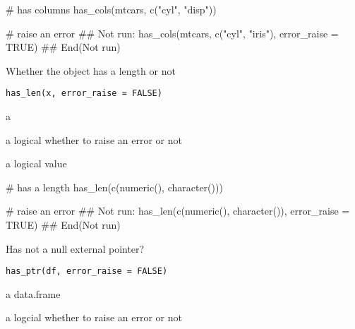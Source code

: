 \documentclass[letterpaper]{book}
\begin{document}
%
\begin{Examples}
\begin{ExampleCode}
# has columns
has_cols(mtcars, c("cyl", "disp"))

# raise an error
## Not run: 
has_cols(mtcars, c("cyl", "iris"), error_raise = TRUE)
## End(Not run)

\end{ExampleCode}
\end{Examples}
%
\begin{Description}
Whether the object has a length or not
\end{Description}
%
\begin{Usage}
\begin{verbatim}
has_len(x, error_raise = FALSE)
\end{verbatim}
\end{Usage}
%
\begin{Arguments}
\begin{ldescription}
\item[\code{x}] a

\item[\code{error\_raise}] a logical whether to raise an error or not
\end{ldescription}
\end{Arguments}
%
\begin{Value}
a logical value
\end{Value}
%
\begin{Examples}
\begin{ExampleCode}
# has a length
has_len(c(numeric(), character()))

# raise an error
## Not run: 
has_len(c(numeric(), character()), error_raise = TRUE)
## End(Not run)

\end{ExampleCode}
\end{Examples}
%
\begin{Description}
Has not a null external pointer?
\end{Description}
%
\begin{Usage}
\begin{verbatim}
has_ptr(df, error_raise = FALSE)
\end{verbatim}
\end{Usage}
%
\begin{Arguments}
\begin{ldescription}
\item[\code{df}] a data.frame

\item[\code{error\_raise}] a logcial whether to raise an error or not
\end{ldescription}
\end{Arguments}
\end{document}
